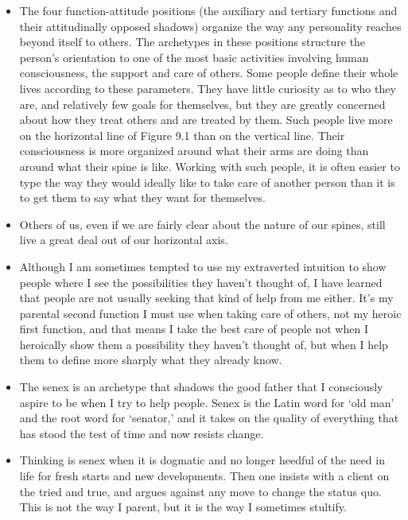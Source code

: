 \begin{itemize}
\item The four function-attitude positions (the auxiliary and tertiary
functions and their attitudinally opposed shadows) organize the way any
personality reaches beyond itself to others. The archetypes in these positions
structure the person’s orientation to one of the most basic activities
involving human consciousness, the support and care of others. Some people
define their whole lives according to these parameters. They have little
curiosity as to who they are, and relatively few goals for themselves, but they
are greatly concerned about how they treat others and are treated by them. Such
people live more on the horizontal line of Figure 9.1 than on the vertical
line. Their consciousness is more organized around what their arms are doing
than around what their spine is like. Working with such people, it is often
easier to type the way they would ideally like to take care of another person
than it is to get them to say what they want for themselves.

\item Others of us, even if we are fairly clear about the nature of our spines,
still live a great deal out of our horizontal axis.

\item Although I am sometimes tempted to use my extraverted intuition to show
people where I see the possibilities they haven’t thought of, I have learned
that people are not usually seeking that kind of help from me either. It’s my
parental second function I must use when taking care of others, not my heroic
first function, and that means I take the best care of people not when I
heroically show them a possibility they haven’t thought of, but when I help
them to define more sharply what they already know.

\item The senex is an archetype that shadows the good father that I
consciously aspire to be when I try to help people. Senex is the Latin word for
‘old man’ and the root word for ‘senator,’ and it takes on the quality of
everything that has stood the test of time and now resists change.

\item Thinking is senex when it is dogmatic and no longer heedful of the need
in life for fresh starts and new developments. Then one insists with a client
on the tried and true, and argues against any move to change the status quo.
This is not the way I parent, but it is the way I sometimes stultify.


\end{itemize}
